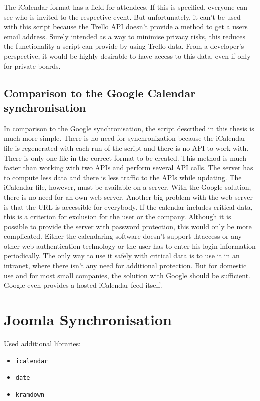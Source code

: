 The iCalendar format has a field for attendees. If this is specified, everyone can see who is invited to the respective event. But unfortunately, it can't be used with this script because the Trello API doesn't provide a method to get a users email address. Surely intended as a way to minimise privacy risks, this reduces the functionality a script can provide by using Trello data. From a developer's perspective, it would be highly desirable to have access to this data, even if only for private boards.

\subsection{Comparison to the Google Calendar synchronisation} 

In comparison to the Google synchronisation, the script described in this thesis is much more simple. There is no need for synchronization because the iCalendar file is regenerated with each run of the script and there is no API to work with. There is only one file in the correct format to be created. This method is much faster than working with two APIs and perform several API calls. The server has to compute less data and there is less traffic to the APIs while updating. The iCalendar file, however, must be available on a server. With the Google solution, there is no need for an own web server. Another big problem with the web server is that the URL is accessible for everybody. If the calendar includes critical data, this is a criterion for exclusion for the user or the company. Although it is possible to provide the server with password protection, this would only be more complicated. Either the calendaring software doesn't support .htaccess or any other web authentication technology or the user has to enter his login information periodically. The only way to use it safely with critical data is to use it in an intranet, where there isn't any need for additional protection. But for domestic use and for most small companies, the solution with Google should be sufficient. Google even provides a hosted iCalendar feed itself. 

\section{Joomla Synchronisation}

Used additional libraries:
\begin{itemize}
	\item \texttt{icalendar}
	\item \texttt{date}
	\item \texttt{kramdown}
\end{itemize}

